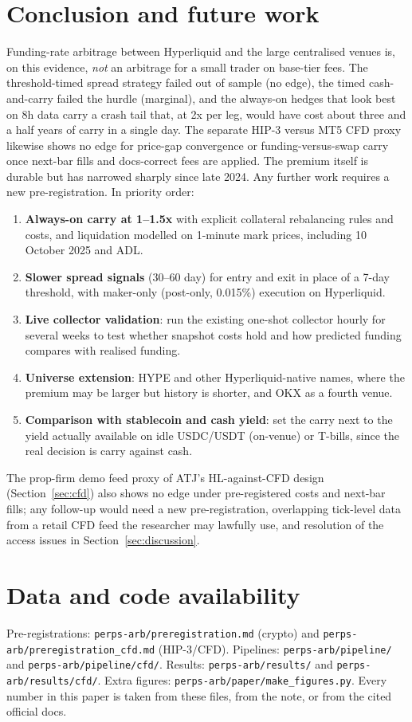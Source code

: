 \documentclass[11pt,a4paper]{article}
\begin{document}
\section{Conclusion and future work}
\label{sec:conclusion}
Funding-rate arbitrage between Hyperliquid and the large centralised venues is, on this evidence, \emph{not} an arbitrage for a small trader on base-tier fees. The threshold-timed spread strategy failed out of sample (no edge), the timed cash-and-carry failed the hurdle (marginal), and the always-on hedges that look best on 8h data carry a crash tail that, at 2x per leg, would have cost about three and a half years of carry in a single day. The separate HIP-3 versus MT5 CFD proxy likewise shows no edge for price-gap convergence or funding-versus-swap carry once next-bar fills and docs-correct fees are applied.
The premium itself is durable but has narrowed sharply since late 2024.
Any further work requires a new pre-registration. In priority order:
\begin{enumerate}
\item \textbf{Always-on carry at 1--1.5x} with explicit collateral rebalancing rules and costs, and liquidation modelled on 1-minute mark prices, including 10 October 2025 and ADL.
\item \textbf{Slower spread signals} (30--60 day) for entry and exit in place of a 7-day threshold, with maker-only (post-only, 0.015\%) execution on Hyperliquid.
\item \textbf{Live collector validation}: run the existing one-shot collector hourly for several weeks to test whether snapshot costs hold and how predicted funding compares with realised funding.
\item \textbf{Universe extension}: HYPE and other Hyperliquid-native names, where the premium may be larger but history is shorter, and OKX as a fourth venue.
\item \textbf{Comparison with stablecoin and cash yield}: set the carry next to the yield actually available on idle USDC/USDT (on-venue) or T-bills, since the real decision is carry against cash.
\end{enumerate}
The prop-firm demo feed proxy of ATJ's HL-against-CFD design (Section~\ref{sec:cfd}) also shows no edge under pre-registered costs and next-bar fills; any follow-up would need a new pre-registration, overlapping tick-level data from a retail CFD feed the researcher may lawfully use, and resolution of the access issues in Section~\ref{sec:discussion}.

\section*{Data and code availability}
\sloppy
Pre-registrations: \texttt{perps-arb/preregistration.md} (crypto) and \texttt{perps-arb/preregistration\_cfd.md} (HIP-3/CFD). Pipelines: \texttt{perps-arb/pipeline/} and \texttt{perps-arb/pipeline/cfd/}. Results: \texttt{perps-arb/results/} and \texttt{perps-arb/results/cfd/}. Extra figures: \texttt{perps-arb/paper/make\_figures.py}. Every number in this paper is taken from these files, from the note, or from the cited official docs.
\end{document}
